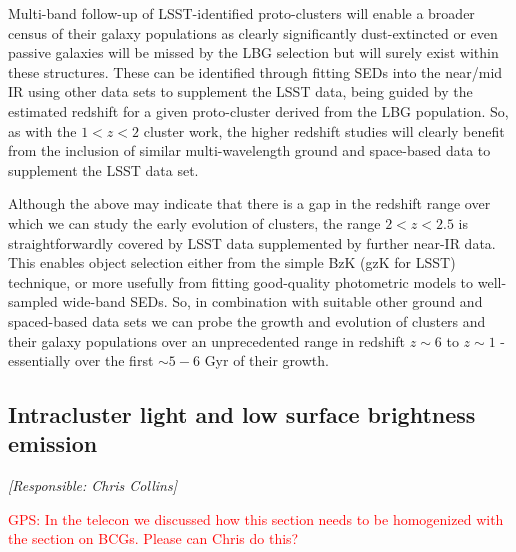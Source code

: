 \documentclass[a4paper,11pt]{article}
\newcommand{\red}{\textcolor{red}}
\begin{document}
Multi-band follow-up of LSST-identified proto-clusters will enable a
broader census of their galaxy populations as clearly significantly
dust-extincted or even passive galaxies will be missed by the LBG
selection but will surely exist within these structures.  These can be
identified through fitting SEDs into the near/mid IR using other data
sets to supplement the LSST data, being guided by the estimated
redshift for a given proto-cluster derived from the LBG
population. So, as with the $1<z<2$ cluster work, the higher redshift
studies will clearly benefit from the inclusion of similar
multi-wavelength ground and space-based data to supplement the LSST
data set.

Although the above may indicate that there is a gap in the redshift
range over which we can study the early evolution of clusters, the
range $2<z<2.5$ is straightforwardly covered by LSST data supplemented
by further near-IR data. This enables object selection either from the
simple BzK (gzK for LSST) technique, or more usefully from fitting
good-quality photometric models to well-sampled wide-band SEDs. So, in
combination with suitable other ground and spaced-based data sets we
can probe the growth and evolution of clusters and their galaxy
populations over an unprecedented range in redshift $z\sim 6$ to
$z\sim 1$ - essentially over the first $\sim5-6$ Gyr of their growth.

\subsection{Intracluster light and low surface brightness emission} \label{sec:lsb}

{\it [Responsible: Chris Collins]}

\noindent\red{GPS: In the telecon we discussed how this section needs
  to be homogenized with the section on BCGs.  Please can Chris do
  this?}
\end{document}
